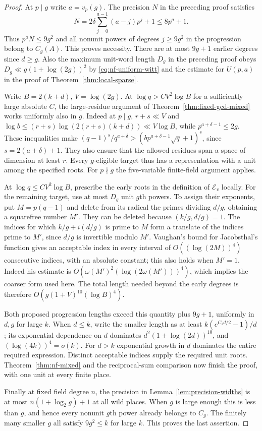 \documentclass[11pt,letterpaper]{article}
\theoremstyle{definition}
\numberwithin{equation}{section}
\begin{document}
\begin{proof}
At $p\mid g$ write $a=v_p(g)$. The precision $N$ in the preceding
proof satisfies
\[
 N=2\delta\sum_{j=0}^{a-1}(a-j)p^j+1\le 8p^a+1 .
\]
Thus $p^aN\le9g^2$ and all nonunit powers of degrees $j\ge9g^2$
in the progression belong to $C_g(A)$. This proves necessity.
There are at most $9g+1$ earlier degrees since $d\ge g$.
Also the maximum unit-word length $D_g$ in the preceding proof obeys
$D_g\ll g(1+\log(2g))^2$ by \eqref{eq:nf-uniform-witt} and the
estimate for $U(p,a)$ in the proof of Theorem~\ref{thm:local-sparse}.

Write $B=2(k+d)$, $V=\log(2g)$. At $\log q>C V^2\log B$ for
a sufficiently large absolute $C$, the large-residue argument of
Theorem~\ref{thm:fixed-gcd-mixed} works uniformly also in $g$.
Indeed at $p\mid g$, $r+s\ll V$ and
$\log b\le (r+s)\log(2(r+s)(k+d))\ll V\log B$, while
$p^{a+\delta-1}\le2g$. These inequalities make
$(q-1)^s/q^{a+\delta}>(b p^{a+\delta-1}\sqrt q+1)^s$, since
$s=2(a+\delta)+1$. They also ensure that the allowed residues span
a space of dimension at least $r$. Every $g$-eligible target thus
has a representation with a unit among the specified roots.
For $p\nmid g$ the five-variable finite-field argument applies.

At $\log q\le C V^2\log B$, prescribe the early roots in the
definition of $\mathcal E_v$ locally. For the remaining target,
use at most $D_g$ unit $g$th powers. To assign their exponents,
put $M=p(q-1)$ and delete from its radical the primes dividing $d/g$,
obtaining a squarefree number $M'$. They can be deleted because
$(k/g,d/g)=1$. The indices for which $k/g+i(d/g)$ is prime to
$M$ form a translate of the indices prime to $M'$, since $d/g$
is invertible modulo $M'$. Vaughan's bound for Jacobsthal's function
\cite{NFMixedJacob} gives an acceptable index in every interval of
$O((\log(2M))^4)$ consecutive indices, with an absolute constant;
this also holds when $M'=1$. Indeed his estimate is
$O(\omega(M')^2(\log(2\omega(M')))^4)$, which implies the coarser
form used here. The total length needed beyond the early degrees is
therefore $O(g(1+V)^{10}(\log B)^4)$.

Both proposed progression lengths exceed this quantity plus $9g+1$,
uniformly in $d,g$ for large $k$. When $d\le k$, write the smaller
length as at least $k(e^{C_1 d/2}-1)/d$; its exponential dependence
on $d$ dominates $d^2(1+\log(2d))^{10}$, and
$(\log(4k))^4=o(k)$. For $d>k$ exponential growth in $d$ dominates
the entire required expression. Distinct acceptable indices supply
the required unit roots. Theorem~\ref{thm:nf-mixed} and the
reciprocal-sum comparison now finish the proof, with one unit at
every finite place.

Finally at fixed field degree $n$, the precision in
Lemma~\ref{lem:precision-widths} is at most
$n(1+\log_2g)+1$ at all wild places. When $g$ is large enough
this is less than $g$, and hence every nonunit $g$th power already
belongs to $C_g$. The finitely many smaller $g$ all satisfy
$9g^2\le k$ for large $k$. This proves the last assertion.
\end{proof}
\end{document}
